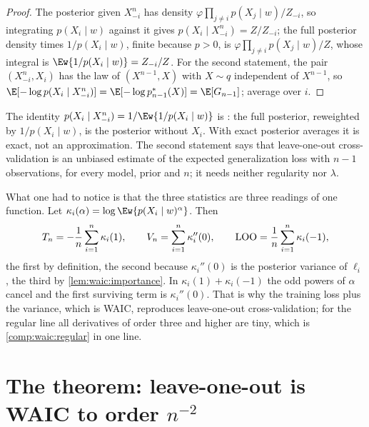 \begin{refsection}
\begin{proof}
The posterior given $X^n_{-i}$ has density $\varphi\prod_{j\ne i}p(X_j\mid w)/Z_{-i}$, so integrating $p(X_i\mid w)$ against it gives $p(X_i\mid X^n_{-i})=Z/Z_{-i}$; the full posterior density times $1/p(X_i\mid w)$, finite because $p>0$, is $\varphi\prod_{j\ne i}p(X_j\mid w)/Z$, whose integral is $\Ew{1/p(X_i\mid w)}=Z_{-i}/Z$. For the second statement, the pair $(X^n_{-i},X_i)$ has the law of $(X^{n-1},X)$ with $X\sim q$ independent of $X^{n-1}$, so $\E[-\log p(X_i\mid X^n_{-i})]=\E[-\log p^*_{n-1}(X)]=\E[G_{n-1}]$; average over $i$.
\end{proof}

The identity $p(X_i\mid X^n_{-i})=1/\Ew{1/p(X_i\mid w)}$ is : the full posterior, reweighted by $1/p(X_i\mid w)$, is the posterior without $X_i$. With exact posterior averages it is exact, not an approximation. The second statement says that leave-one-out cross-validation is an unbiased estimate of the expected generalization loss with $n-1$ observations, for every model, prior and $n$; it needs neither regularity nor $\lambda$.

What one had to notice is that the three statistics are three readings of one function. Let $\kappa_i(\alpha)=\log\Ew{p(X_i\mid w)^\alpha}$. Then
\begin{equation}\label{eq:waic:readings}
T_n=-\frac1n\sum_{i=1}^n\kappa_i(1),\qquad V_n=\sum_{i=1}^n\kappa_i''(0),\qquad\mathrm{LOO}=\frac1n\sum_{i=1}^n\kappa_i(-1),
\end{equation}
the first by definition, the second because $\kappa_i''(0)$ is the posterior variance of $\ell_i$, the third by \cref{lem:waic:importance}. In $\kappa_i(1)+\kappa_i(-1)$ the odd powers of $\alpha$ cancel and the first surviving term is $\kappa_i''(0)$. That is why the training loss plus the variance, which is WAIC, reproduces leave-one-out cross-validation; for the regular line all derivatives of order three and higher are tiny, which is \cref{comp:waic:regular} in one line.

\section{The theorem: leave-one-out is WAIC to order \texorpdfstring{$n^{-2}$}{1/n\texttwosuperior}}\label{sec:waic:loo}


\end{refsection}
